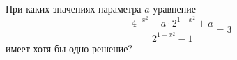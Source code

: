 \begin{ex}
	\begin{condition}
		При каких значениях параметра \( a \) уравнение \[ \dfrac{4^{-x^2}-a\cdot2^{1-x^2}+a}{2^{1-x^2}-1}=3 \] имеет хотя бы одно решение?
	\end{condition}
	\answer{\( a\in(-\infty;-3)\cup[-2;+\infty) \)}
\end{ex}